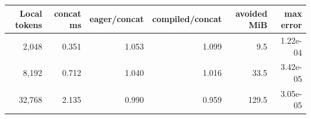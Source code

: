 \begin{tabular}{rrrrrr}
\toprule
Local tokens & concat ms & eager/concat & compiled/concat & avoided MiB & max error \\
\midrule
2,048 & 0.351 & 1.053 & 1.099 & 9.5 & 1.22e-04 \\
8,192 & 0.712 & 1.040 & 1.016 & 33.5 & 3.42e-05 \\
32,768 & 2.135 & 0.990 & 0.959 & 129.5 & 3.05e-05 \\
\bottomrule
\end{tabular}
